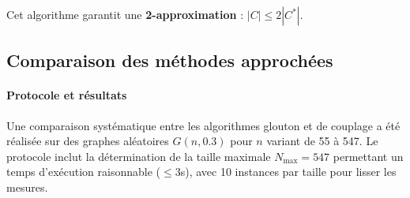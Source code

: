 \documentclass[11pt,a4paper]{article}
\begin{document}
Cet algorithme garantit une \textbf{2-approximation} : $|C| \leq 2|C^*|$.

\subsection{Comparaison des méthodes approchées}

\paragraph{Protocole et résultats}
Une comparaison systématique entre les algorithmes glouton et de couplage a été réalisée sur des graphes aléatoires $G(n,0.3)$ pour $n$ variant de 55 à 547. Le protocole inclut la détermination de la taille maximale $N_{\max}=547$ permettant un temps d'exécution raisonnable ($\leq$3s), avec 10 instances par taille pour lisser les mesures.
\end{document}
